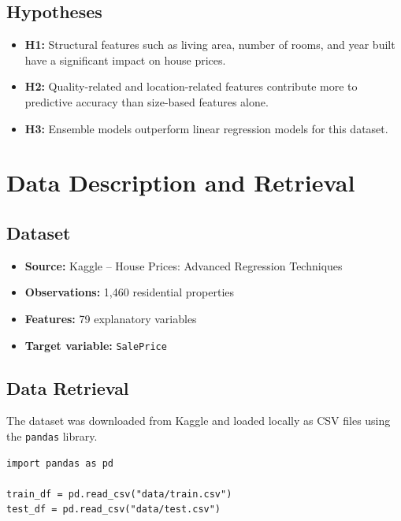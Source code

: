 \documentclass[a4paper]{article}
\begin{document}
\subsection*{Hypotheses}

\begin{itemize}
    \item \textbf{H1:} Structural features such as living area, number of rooms, and year built have a significant impact on house prices.
    \item \textbf{H2:} Quality-related and location-related features contribute more to predictive accuracy than size-based features alone.
    \item \textbf{H3:} Ensemble models outperform linear regression models for this dataset.
\end{itemize}

\section*{Data Description and Retrieval}

\subsection*{Dataset}

\begin{itemize}
    \item \textbf{Source:} Kaggle – House Prices: Advanced Regression Techniques
    \item \textbf{Observations:} 1,460 residential properties
    \item \textbf{Features:} 79 explanatory variables
    \item \textbf{Target variable:} \texttt{SalePrice}
\end{itemize}

\subsection*{Data Retrieval}

The dataset was downloaded from Kaggle and loaded locally as CSV files using the \texttt{pandas} library.

\begin{verbatim}
import pandas as pd

train_df = pd.read_csv("data/train.csv")
test_df = pd.read_csv("data/test.csv")
\end{verbatim}
\end{document}
